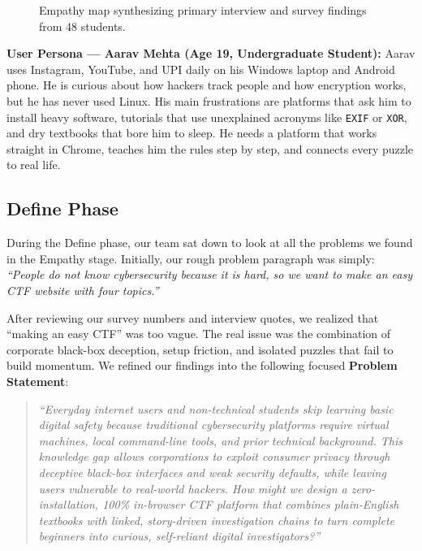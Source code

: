 \documentclass[11pt,a4paper]{article}
\begin{document}
\begin{figure}[!htbp]
{%
}
\caption{Empathy map synthesizing primary interview and survey findings from 48 students.}
\label{fig:empathy_map}
\end{figure}

\noindent
\textbf{User Persona --- Aarav Mehta (Age 19, Undergraduate Student):}
Aarav uses Instagram, YouTube, and UPI daily on his Windows laptop and Android phone. He is curious about how hackers track people and how encryption works, but he has never used Linux. His main frustrations are platforms that ask him to install heavy software, tutorials that use unexplained acronyms like \texttt{EXIF} or \texttt{XOR}, and dry textbooks that bore him to sleep. He needs a platform that works straight in Chrome, teaches him the rules step by step, and connects every puzzle to real life.

\subsection{Define Phase}
During the Define phase, our team sat down to look at all the problems we found in the Empathy stage. Initially, our rough problem paragraph was simply: \textit{``People do not know cybersecurity because it is hard, so we want to make an easy CTF website with four topics.''}

After reviewing our survey numbers and interview quotes, we realized that ``making an easy CTF'' was too vague. The real issue was the combination of corporate black-box deception, setup friction, and isolated puzzles that fail to build momentum. We refined our findings into the following focused \textbf{Problem Statement}:

\begin{quote}
\textit{``Everyday internet users and non-technical students skip learning basic digital safety because traditional cybersecurity platforms require virtual machines, local command-line tools, and prior technical background. This knowledge gap allows corporations to exploit consumer privacy through deceptive black-box interfaces and weak security defaults, while leaving users vulnerable to real-world hackers. How might we design a zero-installation, 100\% in-browser CTF platform that combines plain-English textbooks with linked, story-driven investigation chains to turn complete beginners into curious, self-reliant digital investigators?''}
\end{quote}
\end{document}
